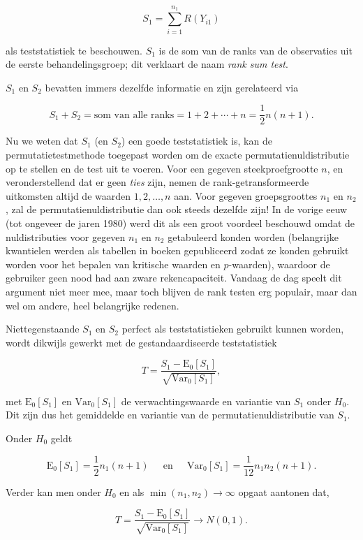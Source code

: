 \documentclass[
  12pt,dutch,coursenotes]{book}
\theoremstyle{definition}
\theoremstyle{definition}
\theoremstyle{definition}
\theoremstyle{definition}
\theoremstyle{remark}
\begin{document}
\[S_1=\sum_{i=1}^{n_1} R(Y_{i1})\]

als teststatistiek te beschouwen. \(S_1\) is de som van de ranks van de observaties uit de eerste behandelingsgroep; dit verklaart de naam \emph{rank sum test}.

\(S_1\) en \(S_2\) bevatten immers dezelfde informatie en zijn gerelateerd via

\[
  S_1+S_2 = \text{som van alle ranks} = 1+2+\cdots + n=\frac{1}{2}n(n+1).
\]

Nu we weten dat \(S_1\) (en \(S_2\)) een goede teststatistiek is, kan de permutatietestmethode toegepast worden om de exacte permutatienuldistributie op te stellen en de test uit te voeren.
Voor een gegeven steekproefgrootte \(n\), en veronderstellend dat er geen \emph{ties} zijn, nemen de rank-getransformeerde uitkomsten altijd de waarden \(1, 2, \ldots, n\) aan. Voor gegeven groepsgroottes \(n_1\) en \(n_2\), zal de permutatienuldistributie dan ook steeds dezelfde zijn! In de vorige eeuw (tot ongeveer de jaren 1980) werd dit als een groot voordeel beschouwd omdat de nuldistributies voor gegeven \(n_1\) en \(n_2\) getabuleerd konden worden (belangrijke kwantielen werden als tabellen in boeken gepubliceerd zodat ze konden gebruikt worden voor het bepalen van kritische waarden en \(p\)-waarden), waardoor de gebruiker geen nood had aan zware rekencapaciteit. Vandaag de dag speelt dit argument niet meer mee, maar toch blijven de rank testen erg populair, maar dan wel om andere, heel belangrijke redenen.

Niettegenstaande \(S_1\) en \(S_2\) perfect als teststatistieken gebruikt kunnen worden, wordt dikwijls gewerkt met de gestandaardiseerde teststatistiek

\[
  T = \frac{S_1-\text{E}_{0}\left[S_1\right]}{\sqrt{\text{Var}_{0}\left[S_1\right]}},
\]

met \(\text{E}_{0}\left[S_1\right]\) en \(\text{Var}_{0}\left[S_1\right]\) de verwachtingswaarde en variantie van \(S_1\) onder \(H_0\). Dit zijn dus het gemiddelde en variantie van de permutatienuldistributie van \(S_1\).

Onder \(H_0\) geldt

\[
   \text{E}_{0}\left[S_1\right]= \frac{1}{2}n_1(n+1) \;\;\;\;\text{ en }\;\;\;\; \text{Var}_{0}\left[S_1\right]=\frac{1}{12}n_1n_2(n+1).
 \]

Verder kan men onder \(H_0\) en als \(\min(n_1,n_2)\rightarrow \infty\) opgaat aantonen dat,

\[
    T = \frac{S_1-\text{E}_{0}\left[S_1\right]}{\sqrt{\text{Var}_{0}\left[S_1\right]}} \rightarrow N(0,1).  
 \]
\end{document}
